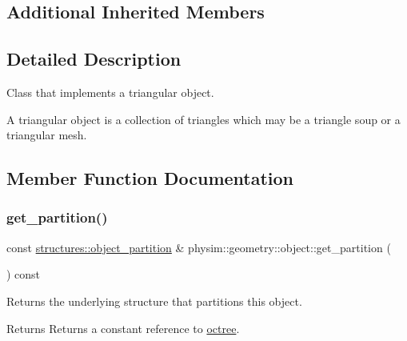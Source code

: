 \subsection*{Additional Inherited Members}


\subsection{Detailed Description}
Class that implements a triangular object. 

A triangular object is a collection of triangles which may be a triangle soup or a triangular mesh. 

\subsection{Member Function Documentation}
\mbox{\label{classphysim_1_1geometry_1_1object_a06967c0a6b95553a2aabce18521ada91}} 
\subsubsection{\texorpdfstring{get\+\_\+partition()}{get\_partition()}}
{\footnotesize\ttfamily const \hyperlink{classphysim_1_1structures_1_1object__partition}{structures\+::object\+\_\+partition} \& physim\+::geometry\+::object\+::get\+\_\+partition (\begin{DoxyParamCaption}{ }\end{DoxyParamCaption}) const}



Returns the underlying structure that partitions this object. 

\begin{DoxyReturn}{Returns}
Returns a constant reference to \hyperlink{classphysim_1_1geometry_1_1object_acfaa1a79d6ea460ca98525e71ebb3d1e}{octree}. 
\end{DoxyReturn}
\mbox{\label{classphysim_1_1geometry_1_1object_a428740c7adc7d17fa4402d06f18f5c4a}} 
